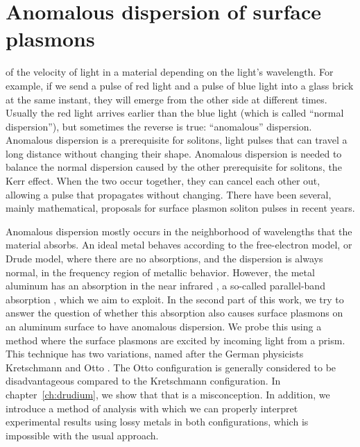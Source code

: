 \section{Anomalous dispersion of surface plasmons}

 of the velocity of light in a material depending on the light's wavelength.
For example, if we send a pulse of red light and a pulse of blue light into a glass brick at the same instant, they will emerge from the other side at different times.
Usually the red light arrives earlier than the blue light (which is called ``normal dispersion''), but sometimes the reverse is true: ``anomalous'' dispersion.
Anomalous dispersion is a prerequisite for solitons, light pulses that can travel a long distance without changing their shape.
Anomalous dispersion is needed to balance the normal dispersion caused by the other prerequisite for solitons, the Kerr effect.
When the two occur together, they can cancel each other out, allowing a pulse that propagates without changing.
There have been several, mainly mathematical, proposals for surface plasmon soliton pulses in recent years.%

Anomalous dispersion mostly occurs in the neighborhood of wavelengths that the material absorbs.
An ideal metal behaves according to the free-electron model, or Drude model, where there are no absorptions, and the dispersion is always normal, in the frequency region of metallic behavior.
However, the metal aluminum has an absorption in the near infrared \cite{Strong1936,Bennett1963}, a so-called parallel-band absorption \cite{Harrison1966}, which we aim to exploit.
In the second part of this work, we try to answer the question of whether this absorption also causes surface plasmons on an aluminum surface to have anomalous dispersion.
We probe this using a method where the surface plasmons are excited by incoming light from a prism.
This technique has two variations, named after the German physicists Kretschmann \cite{Kretschmann1971} and Otto \cite{Otto1968}.
The Otto configuration is generally considered to be disadvantageous compared to the Kretschmann configuration.
In chapter~\ref{ch:drudium}, we show that that is a misconception.
In addition, we introduce a method of analysis with which we can properly interpret experimental results using lossy metals in both configurations, which is impossible with the usual approach.

